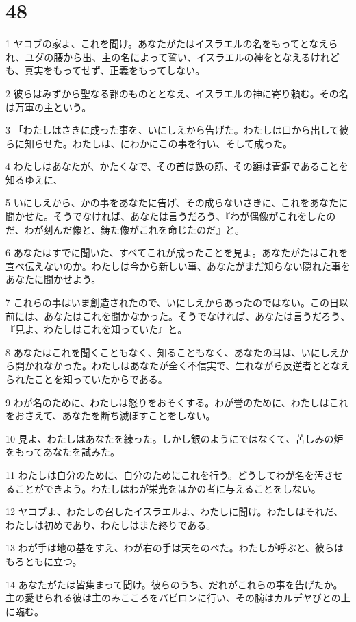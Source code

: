 \chapter{48}

\par 1 ヤコブの家よ、これを聞け。あなたがたはイスラエルの名をもってとなえられ、ユダの腰から出、主の名によって誓い、イスラエルの神をとなえるけれども、真実をもってせず、正義をもってしない。
\par 2 彼らはみずから聖なる都のものととなえ、イスラエルの神に寄り頼む。その名は万軍の主という。
\par 3 「わたしはさきに成った事を、いにしえから告げた。わたしは口から出して彼らに知らせた。わたしは、にわかにこの事を行い、そして成った。
\par 4 わたしはあなたが、かたくなで、その首は鉄の筋、その額は青銅であることを知るゆえに、
\par 5 いにしえから、かの事をあなたに告げ、その成らないさきに、これをあなたに聞かせた。そうでなければ、あなたは言うだろう、『わが偶像がこれをしたのだ、わが刻んだ像と、鋳た像がこれを命じたのだ』と。
\par 6 あなたはすでに聞いた、すべてこれが成ったことを見よ。あなたがたはこれを宣べ伝えないのか。わたしは今から新しい事、あなたがまだ知らない隠れた事をあなたに聞かせよう。
\par 7 これらの事はいま創造されたので、いにしえからあったのではない。この日以前には、あなたはこれを聞かなかった。そうでなければ、あなたは言うだろう、『見よ、わたしはこれを知っていた』と。
\par 8 あなたはこれを聞くこともなく、知ることもなく、あなたの耳は、いにしえから開かれなかった。わたしはあなたが全く不信実で、生れながら反逆者ととなえられたことを知っていたからである。
\par 9 わが名のために、わたしは怒りをおそくする。わが誉のために、わたしはこれをおさえて、あなたを断ち滅ぼすことをしない。
\par 10 見よ、わたしはあなたを練った。しかし銀のようにではなくて、苦しみの炉をもってあなたを試みた。
\par 11 わたしは自分のために、自分のためにこれを行う。どうしてわが名を汚させることができよう。わたしはわが栄光をほかの者に与えることをしない。
\par 12 ヤコブよ、わたしの召したイスラエルよ、わたしに聞け。わたしはそれだ、わたしは初めであり、わたしはまた終りである。
\par 13 わが手は地の基をすえ、わが右の手は天をのべた。わたしが呼ぶと、彼らはもろともに立つ。
\par 14 あなたがたは皆集まって聞け。彼らのうち、だれがこれらの事を告げたか。主の愛せられる彼は主のみこころをバビロンに行い、その腕はカルデヤびとの上に臨む。
